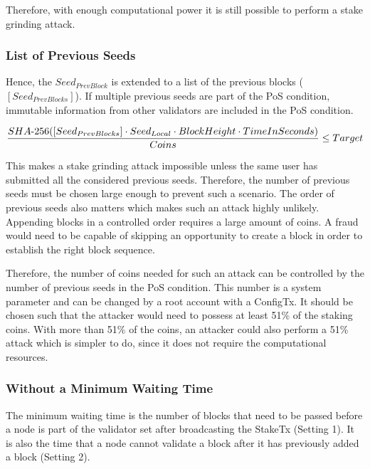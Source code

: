 Therefore, with enough computational power it is still possible to perform a stake grinding attack. 

\subsubsection{List of Previous Seeds}
Hence, the $ Seed_{PrevBlock} $ is extended to a list of the previous blocks ($ [Seed_{PrevBlocks}] $). If multiple previous seeds are part of the PoS condition, immutable information from other validators are included in the PoS condition. 

\begin{equation} 
\label{pos-condition-formula-complete}
\frac{SHA{\text -}256([Seed_{PrevBlocks}] \cdot Seed_{Local} \cdot BlockHeight \cdot TimeInSeconds)}{Coins} \leq Target
\end{equation}

This makes a stake grinding attack impossible unless the same user has submitted all the considered previous seeds. Therefore, the number of previous seeds must be chosen large enough to prevent such a scenario. The order of previous seeds also matters which makes such an attack highly unlikely. Appending blocks in a controlled order requires a large amount of coins. A fraud would need to be capable of skipping an opportunity to create a block in order to establish the right block sequence. 

Therefore, the number of coins needed for such an attack can be controlled by the number of previous seeds in the PoS condition. This number is a system parameter and can be changed by a root account with a ConfigTx. It should be chosen such that the attacker would need to possess at least 51\% of the staking coins. With more than 51\% of the coins, an attacker could also perform a 51\% attack which is simpler to do, since it does not require the computational resources.


\subsubsection{Without a Minimum Waiting Time}\label{stake-grinding-without-a-minimum-waiting-time}
The minimum waiting time is the number of blocks that need to be passed before a node is part of the validator set after broadcasting the StakeTx (Setting 1). It is also the time that a node cannot validate a block after it has previously added a block (Setting 2).



